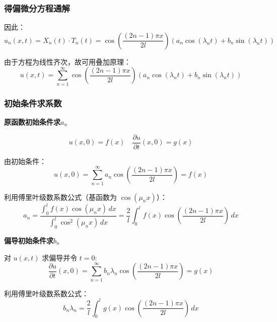\documentclass[12pt,a4paper]{article}
\numberwithin{subsection}{section}   %
\numberwithin{subsubsection}{subsection}
\theoremstyle{plain}
\theoremstyle{definition}
\theoremstyle{remark}
\theoremstyle{remark}
\begin{document}
	\subsubsection{得偏微分方程通解}
	因此：
	\begin{equation}
		u_n(x, t) = X_n(t) \cdot T_n(t) = \cos\left(\frac{(2n-1)\pi x}{2l}\right) \left( a_n \cos(\lambda_n t) + b_n \sin(\lambda_n t) \right)
	\end{equation}
	
	由于方程为线性齐次，故可用叠加原理：
	\begin{equation}
		u(x, t) = \sum_{n=1}^{\infty} \cos\left(\frac{(2n-1)\pi x}{2l}\right) \left( a_n \cos(\lambda_n t) + b_n \sin(\lambda_n t) \right)
	\end{equation}
	
	\subsubsection{初始条件求系数}
	\noindent
	\textbf{原函数初始条件求$a_n$}
	
	\begin{equation}
		u(x, 0) = f(x) \quad \frac{\partial u}{\partial t}(x, 0) = g(x)
	\end{equation}
	
	由初始条件：
	\begin{equation}
		u(x, 0) = \sum_{n=1}^{\infty} a_n \cos\left(\frac{(2n-1)\pi x}{2l}\right) = f(x)
	\end{equation}
	
	利用傅里叶级数系数公式（基函数为 $\cos(\mu_n x)$）：
	\begin{equation}
		a_n = \frac{\int_0^l f(x) \cos(\mu_n x) \, dx}{\int_0^l \cos^2(\mu_n x) \, dx} = \frac{2}{l} \int_0^l f(x) \cos\left(\frac{(2n-1)\pi x}{2l}\right) \, dx
	\end{equation}
	
	\noindent
	\textbf{偏导初始条件求$b_n$}
	
	对 $u(x,t)$ 求偏导并令 $t=0$:
	\begin{equation}
		\frac{\partial u}{\partial t}(x, 0) = \sum_{n=1}^{\infty} b_n \lambda_n \cos\left(\frac{(2n-1)\pi x}{2l}\right) = g(x)
	\end{equation}
	
	利用傅里叶级数系数公式：
	\begin{equation}
		b_n \lambda_n = \frac{2}{l} \int_0^l g(x) \cos\left(\frac{(2n-1)\pi x}{2l}\right) \, dx
	\end{equation}
	
\end{document}
